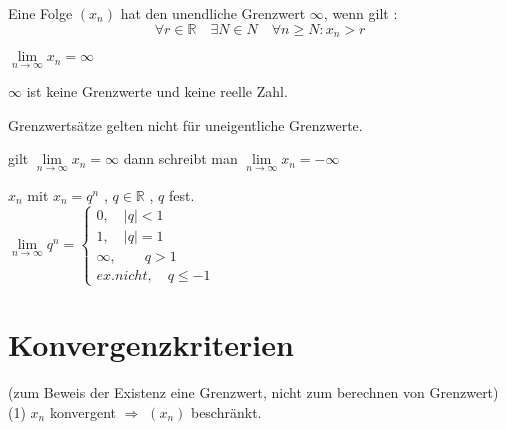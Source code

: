 \begin{definition}
    Eine Folge $(x_n)$ hat den unendliche Grenzwert $\infty$, wenn gilt : \\
    \[\forall r \in \mathbb{R} \quad \exists N \in N \quad \forall n \geq N : x_n > r \]

\begin{schreibweise}
$\lim\limits_{n \rightarrow \infty}{x_n}= \infty$
\end{schreibweise}
\end{definition}

\begin{remark}
    $\infty$ ist keine Grenzwerte und keine reelle Zahl.
\end{remark}

\begin{remark}
    Grenzwertsätze gelten nicht für uneigentliche Grenzwerte.
\end{remark}

\begin{remark}
    gilt $\lim\limits_{n \rightarrow \infty}{x_n}= \infty$ dann schreibt man $\lim\limits_{n \rightarrow \infty}{x_n}= -\infty$
\end{remark}

\begin{example}
    $x_n$ mit $x_n = q^n$ , $q \in \mathbb{R}$ , $q$ fest.\\

    $ \lim\limits_{n \rightarrow \infty}{q^n} = \begin{cases}
                                                    0 ,\quad |q|<1 \\
                                                    1 ,\quad |q|=1 \\
                                                    \infty ,\quad\quad q > 1  \\
                                                    ex. nicht ,\quad q\leq -1
    \end{cases}$
\end{example}

\vfil
\vfil


\section{Konvergenzkriterien}
(zum Beweis der Existenz eine Grenzwert, nicht zum berechnen von Grenzwert) \\


(1) $x_n$ konvergent $\Rightarrow$ $(x_n)$ beschränkt. \\

